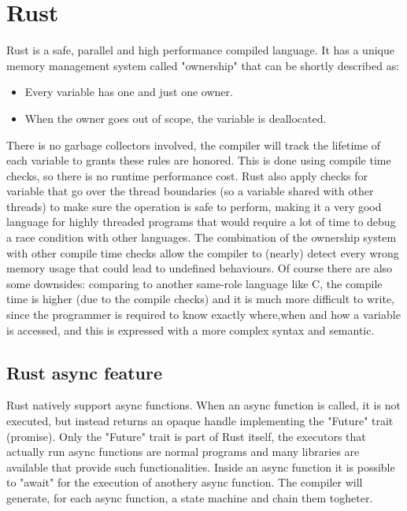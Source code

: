 \chapter{Rust}
Rust is a safe, parallel and high performance compiled language.
It has a unique memory management system called "ownership" that can be shortly described as:
\begin{itemize}
	\item Every variable has one and just one owner.
	\item When the owner goes out of scope, the variable is deallocated.
\end{itemize}
There is no garbage collectors involved, the compiler will track the lifetime of each variable to grants these rules are honored. This is done using compile time checks, so there is no runtime performance cost. Rust also apply checks for variable that go over the thread boundaries (so a variable shared with other threads) to make sure the operation is safe to perform, making it a very good language for highly threaded programs that would require a lot of time to debug a race condition with other languages.
The combination of the ownership system with other compile time checks allow the compiler to (nearly) detect every wrong memory usage that could lead to undefined behaviours. Of course there are also some downsides: comparing to another same-role language like C, the compile time is higher (due to the compile checks) and it is much more difficult to write, since the programmer is required to know exactly where,when and how a variable is accessed, and this is expressed with a more complex syntax and semantic.

\section{Rust async feature}
Rust natively support async functions. When an async function is called, it is not executed, but instead returns an opaque handle implementing the "Future" trait (promise). Only the "Future" trait is part of Rust itself, the executors that actually run async functions are normal programs and many libraries are available that provide such functionalities. Inside an async function it is possible to "await" for the execution of anothery async function. The compiler will generate, for each async function, a state machine and chain them togheter.